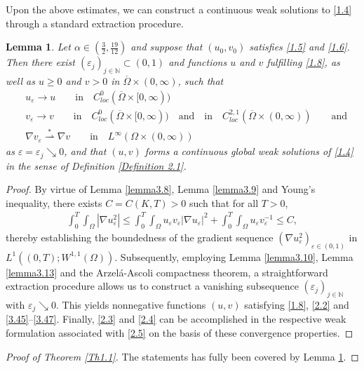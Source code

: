 \documentclass[12pt]{article}
\theoremstyle{plain}
\newtheorem{lemma}{Lemma}[section]
\theoremstyle{definition}
\numberwithin{equation}{section}
\begin{document}
Upon the above estimates, we can construct a continuous weak solutions to \eqref{1.4} through a standard extraction procedure.
\begin{lemma}\label{lemma3.14}
    Let $\alpha\in(\frac{3}{2},\frac{19}{12})$ and suppose that $(u_0,v_0)$ satisfies \eqref{1.5} and \eqref{1.6}. Then there exist
    $(\varepsilon_{j})_{j\in \mathbb{N}}\subset (0,1)$ and functions $u$ and $v$ fulfilling \eqref{1.8}, as well as $u\geq 0$ and $v>0$ in $\overline{\Omega}\times(0,\infty)$,
such that
\begin{align}
    &u_{\varepsilon}\rightarrow{u}\qquad \text{in}\quad C_{loc}^{0}(\overline{\Omega}\times[0,\infty))\label{3.45}\\
    &v_{\varepsilon}\rightarrow{v}\qquad \text{in}\quad C_{loc}^{0}(\overline{\Omega}\times[0,\infty))\quad \text{and}\quad\text{in}\quad C_{loc}^{2,1}(\overline{\Omega}\times(0,\infty))\qquad \text{and}\label{3.46}\\
    &\nabla v_{\varepsilon}\stackrel{*}{\rightharpoonup}\nabla v\qquad  \text{in}\quad L^{\infty}(\Omega\times(0,\infty))\label{3.47}
\end{align}
as $\varepsilon=\varepsilon_{j}\searrow0$, and that $(u,v)$ forms a continuous global weak solutions of \eqref{1.4} in the sense of
Definition \ref{Definition 2.1}.
\end{lemma}
\begin{proof}
    By virtue of Lemma \ref{lemma3.8}, Lemma \ref{lemma3.9} and Young's inequality, there exists $C=C(K,T)>0$ such that for all $T>0$,
    \begin{align*}
        \int_0^{T}\int_{\Omega}|\nabla u_{\varepsilon}^2|\leq \int_0^{T}\int_{\Omega}u_{\varepsilon}v_{\varepsilon}|\nabla u_{\varepsilon}|^2+\int_0^{T}\int_{\Omega}u_{\varepsilon}v_{\varepsilon}^{-1}\leq C,
    \end{align*}
    thereby establishing the boundedness of the gradient sequence $(\nabla u_{\varepsilon}^2)_{\varepsilon\in(0,1)}$ in $ L^1((0,T);W^{1,1}(\Omega))$. Subsequently, employing Lemma \ref{lemma3.10}, Lemma \ref{lemma3.13} and the Arzel\'{a}-Ascoli compactness theorem, a straightforward extraction procedure allows us to construct a vanishing subsequence $(\varepsilon_{j})_{j\in \mathbb{N}}$ with $\varepsilon_{j}\searrow0$. This yields nonnegative functions $(u,v)$ satisfying \eqref{1.8}, \eqref{2.2} and \eqref{3.45}--\eqref{3.47}. Finally, \eqref{2.3} and \eqref{2.4} can be accomplished in the respective weak  formulation associated with
      \eqref{2.5} on the basis of   these convergence properties.
\end{proof}
\begin{proof}[Proof of Theorem \ref{Th1.1}] The statements has fully been covered by Lemma \ref{lemma3.14}.
\end{proof}
\end{document}
